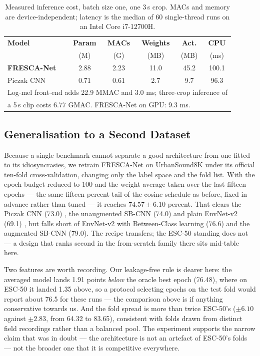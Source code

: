 \documentclass[conference]{IEEEtran}
\begin{document}
\begin{table}[t]
\caption{Measured inference cost, batch size one, one 3\,s crop. MACs and memory are device-independent; latency is the median of 60 single-thread runs on an Intel Core i7-12700H.}
\label{tab:edge}
\begin{center}
\renewcommand{\arraystretch}{1.05}
\setlength{\tabcolsep}{4pt}
\begin{tabular}{|l|c|c|c|c|c|}
\hline
\textbf{Model} & \textbf{Param} & \textbf{MACs} & \textbf{Weights} & \textbf{Act.} & \textbf{CPU} \\
 & (M) & (G) & (MB) & (MB) & (ms) \\
\hline
\textbf{FRESCA-Net} & 2.88 & 2.23 & 11.0 & 45.2 & 100.1 \\
Piczak CNN & 0.71 & 0.61 & 2.7 & 9.7 & 96.3 \\
\hline
\multicolumn{6}{l}{\footnotesize Log-mel front-end adds 22.9 MMAC and 3.0 ms; three-crop inference of} \\
\multicolumn{6}{l}{\footnotesize a 5\,s clip costs 6.77 GMAC. FRESCA-Net on GPU: 9.3 ms.} \\
\end{tabular}
\end{center}
\end{table}

\subsection{Generalisation to a Second Dataset}
Because a single benchmark cannot separate a good architecture from one fitted to its idiosyncrasies, we retrain FRESCA-Net on UrbanSound8K under its official ten-fold cross-validation, changing only the label space and the fold list. With the epoch budget reduced to 100 and the weight average taken over the last fifteen epochs --- the same fifteen percent tail of the cosine schedule as before, fixed in advance rather than tuned --- it reaches $74.57 \pm 6.10$ percent. That clears the Piczak CNN (73.0) \cite{piczak_cnn}, the unaugmented SB-CNN (74.0) \cite{salamon_bello} and plain EnvNet-v2 (69.1) \cite{tokozume_bc}, but falls short of EnvNet-v2 with Between-Class learning (76.6) and the augmented SB-CNN (79.0). The recipe transfers; the ESC-50 standing does not --- a design that ranks second in the from-scratch family there sits mid-table here.

Two features are worth recording. Our leakage-free rule is dearer here: the averaged model lands 1.91 points \emph{below} the oracle best epoch (76.48), where on ESC-50 it landed 1.35 above, so a protocol selecting epochs on the test fold would report about 76.5 for these runs --- the comparison above is if anything conservative towards us. And the fold spread is more than twice ESC-50's ($\pm6.10$ against $\pm2.83$, from 64.32 to 83.65), consistent with folds drawn from distinct field recordings rather than a balanced pool. The experiment supports the narrow claim that was in doubt --- the architecture is not an artefact of ESC-50's folds --- not the broader one that it is competitive everywhere.
\end{document}
